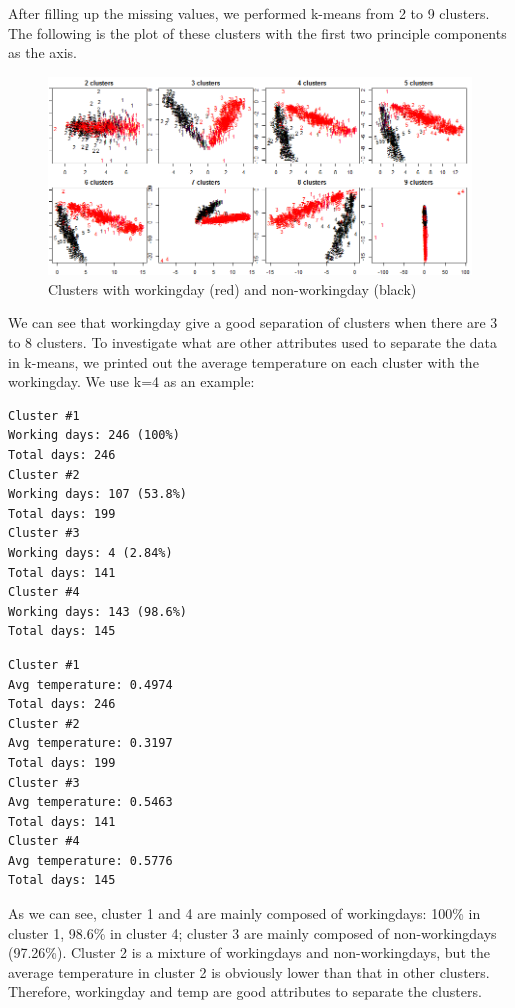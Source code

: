\documentclass[12pt]{article}
\begin{document}
After filling up the missing values, we performed k-means from 2 to 9 clusters. The following is the plot of these clusters with the first two principle components as the axis.
	\begin{figure}[H]
		\centering
		\includegraphics[scale=.65]{figures/kmeans_workingday.png}
		\caption{Clusters with workingday (red) and non-workingday (black)}
	\end{figure}

We can see that workingday give a good separation of clusters when there are 3 to 8 clusters. To investigate what are other attributes used to separate the data in k-means, we printed out the average temperature on each cluster with the workingday. We use k=4 as an example: \color{blue}
\begin{multicols}{2}
	\begin{verbatim}
Cluster #1
Working days: 246 (100%)
Total days: 246
Cluster #2
Working days: 107 (53.8%)
Total days: 199
Cluster #3
Working days: 4 (2.84%)
Total days: 141
Cluster #4
Working days: 143 (98.6%)
Total days: 145
	\end{verbatim}
	\columnbreak
	\begin{verbatim}
Cluster #1
Avg temperature: 0.4974
Total days: 246
Cluster #2
Avg temperature: 0.3197
Total days: 199
Cluster #3
Avg temperature: 0.5463
Total days: 141
Cluster #4
Avg temperature: 0.5776
Total days: 145
	\end{verbatim}
\end{multicols} 
\color{black}
As we can see, cluster 1 and 4 are mainly composed of workingdays: 100\% in cluster 1, 98.6\% in cluster 4; cluster 3 are mainly composed of non-workingdays (97.26\%).  Cluster 2 is a mixture of workingdays and non-workingdays, but the average temperature in cluster 2 is obviously lower than that in other clusters. Therefore, workingday and temp are good attributes to separate the clusters.
\end{document}
